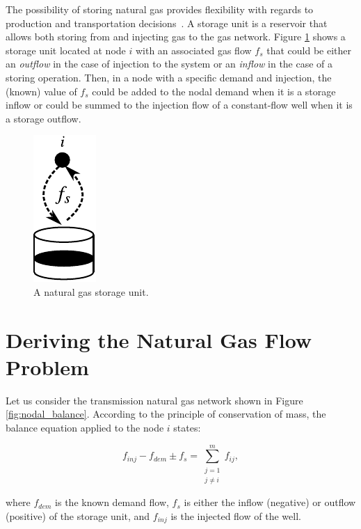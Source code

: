The possibility of storing natural gas provides flexibility with regards to production and transportation decisions~\cite{Midthun2007}. A storage unit is a reservoir that allows both storing from and injecting gas to the gas network. Figure \ref{fig:storage} shows a storage unit located at node $i$ with an associated gas flow $f_s$ that could be either an \textit{outflow} in the case of injection to the system or an \textit{inflow} in the case of a storing operation. Then, in a node with a specific demand and injection, the (known) value of $f_s$ could be added to the nodal demand when it is a storage inflow or could be summed to the injection flow of a constant-flow well when it is a storage outflow.

\begin{figure}[!ht]
	\centering
	\includegraphics[scale=1]{Figures/Storage_unit}
	\caption{A natural gas storage unit.}	
	\label{fig:storage}
\end{figure}

\section{Deriving the Natural Gas Flow Problem}
\label{sec:NGF_problem}

Let us consider the transmission natural gas network shown in Figure \ref{fig:nodal_balance}. According to the principle of conservation of mass, the balance equation applied to the node $i$ states:

\begin{equation}
	\label{eq:balance_eq}
	f_{inj} - f_{dem} \pm f_s = \sum_{\substack{j=1 \\ j \neq i}}^{m} f_{ij},
\end{equation}

where $f_{dem}$ is the known demand flow, $f_s$ is either the  inflow (negative) or outflow (positive) of the storage unit, and $f_{inj}$ is the injected flow of the well. 

